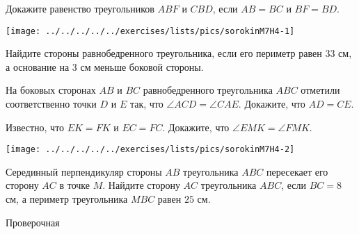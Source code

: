 \begin{homework}[number=4]
	\begin{listofex}
		\item 
		\begin{minipage}[t]{\bodywidth}
			Докажите равенство треугольников \( ABF \) и \( CBD \), если  \( AB=BC \) и \( BF=BD \).
		\end{minipage}
		\hspace{0.02\linewidth}
		\begin{minipage}[t]{\picwidth}
			\texttt{[image: ../../../../../exercises/lists/pics/sorokinM7H4-1]}
		\end{minipage}
		\item  Найдите стороны равнобедренного треугольника, если его периметр равен \( 33 \) см, а основание на \( 3 \) см меньше боковой стороны.
		\item На боковых сторонах \( AB \) и \( BC \) равнобедренного треугольника \( ABC \) отметили соответственно точки \( D \) и  \( E \) так, что \( \angle ACD = \angle CAE \). Докажите, что \( AD=CE \).
		\item \begin{minipage}[t]{\bodywidth}
			Известно, что \( EK = FK \) и \( EC = FC \). Докажите, что \( \angle EMK = \angle FMK \).
		\end{minipage}
		\hspace{0.02\linewidth}
		\begin{minipage}[t]{\picwidth}
			\texttt{[image: ../../../../../exercises/lists/pics/sorokinM7H4-2]}
		\end{minipage}
		\item Серединный перпендикуляр стороны \( AB \) треугольника \( ABC \) пересекает его сторону \( AC \) в точке \( M \). Найдите сторону \( AC \) треугольника \( ABC \), если \( BC=8 \) см, а периметр треугольника \( MBC \) равен \( 25 \) см.
	\end{listofex}
\end{homework}



\begin{exam}
	\begin{listofex}
		\item Проверочная
	\end{listofex}
\end{exam}
